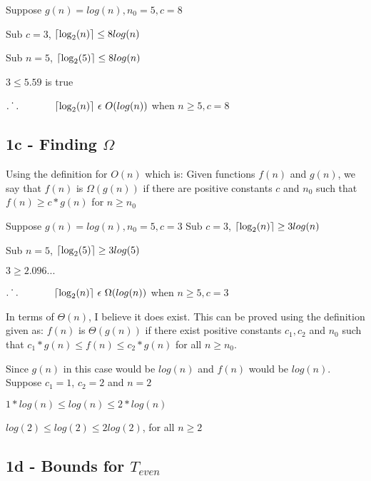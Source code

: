 \documentclass[oneside, a4paper]{article}
\DeclarePairedDelimiter\ceil{\lceil}{\rceil}
\begin{document}
\begin{center}
    Suppose $g(n) = log(n), n_0 = 5, c = 8$

    Sub $c = 3$, $\ceil{\log_2(n)} \leq 8log(n)$

    Sub $n = 5$, $\ceil{\log_2(5)}  \leq 8log(n)$

    $3 \leq 5.59$ is true

    $\dot{.\hspace{.095in}.}\hspace{.5in} \ceil{\log_2(n)} \text{ }\epsilon \text{ } O(log(n))$ when $n \geq 5, c = 8$
\end{center}

 
\subsection*{1c - Finding $\Omega$}
Using the definition for $O(n)$ which is:
Given functions $f(n)$ and $g(n)$, we say that $f(n)$ is $\Omega(g(n))$ if there are positive constants $c$ and $n_0$ such that $f(n) \geq c * g(n)$ for $n \geq n_0$

\begin{center}
    Suppose $g(n) = log(n), n_0 = 5, c = 3$
    Sub $c = 3$, $\ceil{\log_2(n)} \geq 3log(n)$

    Sub $n = 5$, $\ceil{\log_2(5)} \geq 3log(5)$

    $3 \geq 2.096...$

    $\dot{.\hspace{.095in}.}\hspace{.5in} \ceil{\log_2(n)} \text{  }\epsilon \text{ } \Omega(log(n))$ when $n \geq 5, c = 3$
\end{center}

In terms of $\Theta(n)$, I believe it does exist. This can be proved using the definition given as:
$f(n)$ is $\Theta(g(n))$ if there exist positive constants $c_1, c_2$ and $n_0$ such that $c_1 * g(n) \leq f(n) \leq c_2 * g(n)$ for all $n \geq n_0$.

Since $g(n)$ in this case would be $log(n)$ and $f(n)$ would be $log(n)$. Suppose $c_1 = 1$, $c_2 = 2$ and $n = 2$

$1 * log(n) \leq log(n) \leq 2 * log(n)$ 

$log(2) \leq log(2) \leq 2log(2)$, for all $n \geq 2$

\subsection*{1d - Bounds for $T_{even}$}
\end{document}
